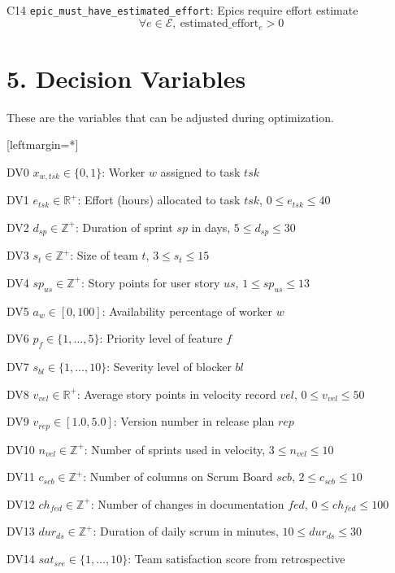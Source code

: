 \documentclass[12pt]{article}
\begin{document}
    \item[C14] \texttt{epic\_must\_have\_estimated\_effort}: Epics require effort estimate
    \[
    \forall e \in \mathcal{E},\ \text{estimated\_effort}_e > 0
    \]

\section{5. Decision Variables}
These are the variables that can be adjusted during optimization.

[leftmargin=*]
    \item[DV0] $ x_{w,tsk} \in \{0,1\} $: Worker $ w $ assigned to task $ tsk $
    \item[DV1] $ e_{tsk} \in \mathbb{R}^+ $: Effort (hours) allocated to task $ tsk $, $ 0 \leq e_{tsk} \leq 40 $
    \item[DV2] $ d_{sp} \in \mathbb{Z}^+ $: Duration of sprint $ sp $ in days, $ 5 \leq d_{sp} \leq 30 $
    \item[DV3] $ s_t \in \mathbb{Z}^+ $: Size of team $ t $, $ 3 \leq s_t \leq 15 $
    \item[DV4] $ sp_{us} \in \mathbb{Z}^+ $: Story points for user story $ us $, $ 1 \leq sp_{us} \leq 13 $
    \item[DV5] $ a_w \in [0,100] $: Availability percentage of worker $ w $
    \item[DV6] $ p_f \in \{1,\dots,5\} $: Priority level of feature $ f $
    \item[DV7] $ s_{bl} \in \{1,\dots,10\} $: Severity level of blocker $ bl $
    \item[DV8] $ v_{vel} \in \mathbb{R}^+ $: Average story points in velocity record $ vel $, $ 0 \leq v_{vel} \leq 50 $
    \item[DV9] $ v_{rep} \in [1.0, 5.0] $: Version number in release plan $ rep $
    \item[DV10] $ n_{vel} \in \mathbb{Z}^+ $: Number of sprints used in velocity, $ 3 \leq n_{vel} \leq 10 $
    \item[DV11] $ c_{scb} \in \mathbb{Z}^+ $: Number of columns on Scrum Board $ scb $, $ 2 \leq c_{scb} \leq 10 $
    \item[DV12] $ ch_{fed} \in \mathbb{Z}^+ $: Number of changes in documentation $ fed $, $ 0 \leq ch_{fed} \leq 100 $
    \item[DV13] $ dur_{ds} \in \mathbb{Z}^+ $: Duration of daily scrum in minutes, $ 10 \leq dur_{ds} \leq 30 $
    \item[DV14] $ sat_{sre} \in \{1,\dots,10\} $: Team satisfaction score from retrospective
\end{document}
